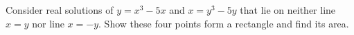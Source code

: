 Consider real solutions of $ y=x^3-5x $ and $ x=y^3-5y $ that lie on neither line $ x=y $ nor line $ x=-y $. Show these four points form a rectangle and find its area.

